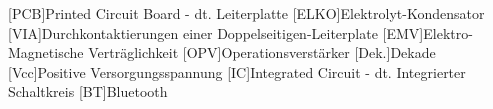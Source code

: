 
\begin{acronym}[ACRONYM]
[PCB]{Printed Circuit Board - dt. Leiterplatte}
[ELKO]{Elektrolyt-Kondensator}
[VIA]{Durchkontaktierungen einer Doppelseitigen-Leiterplate}
[EMV]{Elektro-Magnetische Verträglichkeit}
[OPV]{Operationsverstärker}
[Dek.]{Dekade}
[Vcc]{Positive Versorgungsspannung}
[IC]{Integrated Circuit - dt. Integrierter Schaltkreis}
[BT]{Bluetooth}


\end{acronym}\newpage

